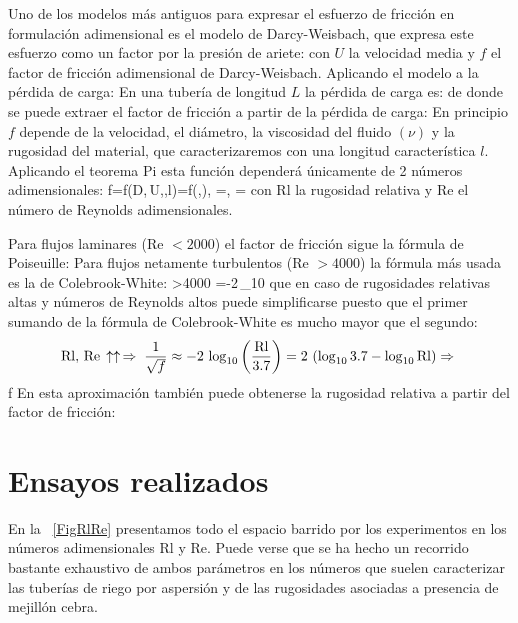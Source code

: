 \documentclass[a4paper]{article}
\begin{document}
Uno de los modelos más antiguos para expresar el esfuerzo de fricción en
formulación adimensional es el modelo de Darcy-Weisbach, que expresa este
esfuerzo como un factor por la presión de ariete:
con $U$ la velocidad media y $f$ el factor de fricción adimensional de
Darcy-Weisbach. Aplicando el modelo a la pérdida de carga:
En una tubería de longitud $L$ la pérdida de carga es:
de donde se puede extraer el factor de fricción a partir de la pérdida de carga:
En principio $f$ depende de la velocidad, el diámetro, la viscosidad del fluido
$(\nu)$ y la rugosidad del material, que caracterizaremos con una longitud
característica $l$. Aplicando el teorema Pi esta función dependerá únicamente de
2 números adimensionales:
\EQ
{
  f=f(D,\,U,\;\nu,\;l)=f(,\;),\quad
  =,\quad
  =
}
con Rl la rugosidad relativa y Re el número de Reynolds adimensionales.

Para flujos laminares (Re $<2000$) el factor de fricción sigue la fórmula de
Poiseuille:
Para flujos netamente turbulentos (Re $>4000$) la fórmula más usada es la de
Colebrook-White:
\EQ
{
  >4000\Rightarrow\;
  =-2\,\log_{10}
}\label{EqColebrookWhite}
que en caso de rugosidades relativas altas y números de Reynolds altos puede
simplificarse puesto que el primer sumando de la fórmula de Colebrook-White es
mucho mayor que el segundo:
\[
  \mathrm{Rl,\,Re}\,\uparrow\uparrow\,\Rightarrow\;
  \frac1{\sqrt{f}}\approx-2\,\log_{10}\left(\frac{\mathrm{Rl}}{3.7}\right)
  =2\,\left(\log_{10}3.7-\log_{10}\mathrm{Rl}\right)\Rightarrow\;
\]
\EQ
{
  f\approx{}
  \label{EqColebrookWhiteSimplified}
}
En esta aproximación también puede obtenerse la rugosidad relativa a partir
del factor de fricción:

\section{Ensayos realizados}

En la \figurename~\ref{FigRlRe} presentamos todo el espacio barrido por los
experimentos en los números adimensionales Rl y Re. Puede verse que se ha hecho
un recorrido bastante exhaustivo de ambos parámetros en los números que suelen
caracterizar las tuberías de riego por aspersión y de las rugosidades asociadas
a presencia de mejillón cebra.
\end{document}
